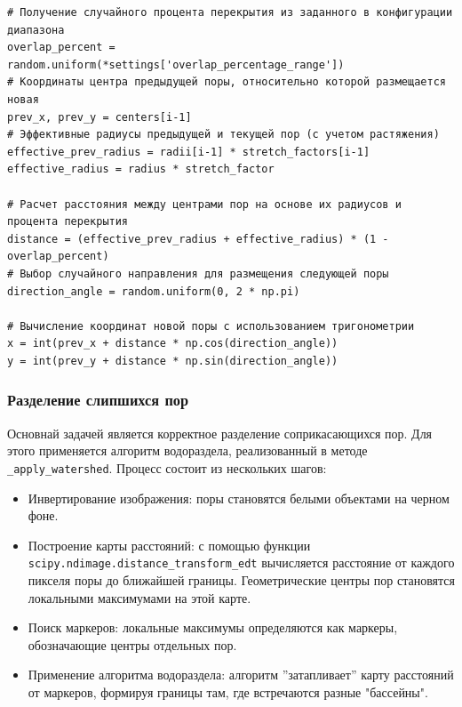 \documentclass[code]{wordcore}
\begin{document}
\begin{code}
	\begin{verbatim}
# Получение случайного процента перекрытия из заданного в конфигурации диапазона
overlap_percent = random.uniform(*settings['overlap_percentage_range'])
# Координаты центра предыдущей поры, относительно которой размещается новая
prev_x, prev_y = centers[i-1]
# Эффективные радиусы предыдущей и текущей пор (с учетом растяжения)
effective_prev_radius = radii[i-1] * stretch_factors[i-1]
effective_radius = radius * stretch_factor

# Расчет расстояния между центрами пор на основе их радиусов и процента перекрытия
distance = (effective_prev_radius + effective_radius) * (1 - overlap_percent)
# Выбор случайного направления для размещения следующей поры
direction_angle = random.uniform(0, 2 * np.pi)

# Вычисление координат новой поры с использованием тригонометрии
x = int(prev_x + distance * np.cos(direction_angle))
y = int(prev_y + distance * np.sin(direction_angle))
  \end{verbatim}
\end{code}

\subsubsection{Разделение слипшихся пор}

Основнай задачей является корректное разделение соприкасающихся пор. Для этого применяется алгоритм водораздела, реализованный в методе \texttt{\_apply\-\_watershed}. Процесс состоит из нескольких шагов:

\begin{itemize}
	\item Инвертирование изображения: поры становятся белыми объектами на черном фоне.
	\item Построение карты расстояний: с помощью функции \texttt{scipy.ndimage.di\-stance\_transform\_edt} вычисляется расстояние от каждого пикселя поры до ближайшей границы. Геометрические центры пор становятся локальными максимумами на этой карте.
	\item Поиск маркеров: локальные максимумы определяются как маркеры, обозначающие центры отдельных пор.
	\item Применение алгоритма водораздела: алгоритм ''затапливает'' карту расстояний от маркеров, формируя границы там, где встречаются разные "бассейны".
\end{itemize}
\end{document}
